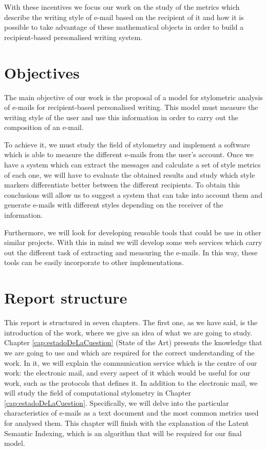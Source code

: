 With these incentives we focus our work on the study of the metrics which describe the writing style of e-mail based on the recipient of it and how it is possible to take advantage of these mathematical objects in order to build a recipient-based personalised writing system.

\section{Objectives}\label{sect:obj}
The main objective of our work is the proposal of a model for stylometric analysis of e-mails for recipient-based personalised writing. This model must measure the writing style of the user and use this information in order to carry out the composition of an e-mail.

To achieve it, we must study the field of stylometry and implement a software which is able to measure the different e-mails from the user's account. Once we have a system which can extract the messages and calculate a set of style metrics of each one, we will have to evaluate the obtained results and study which style markers differentiate better between the different recipients. To obtain this conclusions will allow us to suggest a system that can take into account them and generate e-mails with different styles depending on the receiver of the information.

Furthermore, we will look for developing reusable tools that could be use in other similar projects. With this in mind we will develop some web services which carry out the different task of extracting and measuring the e-mails. In this way, these tools can be easily incorporate to other implementations.

\section{Report structure}\label{sect:structure}
This report is structured in seven chapters. The first one, as we have said, is the introduction of the work, where we give an idea of what we are going to study. Chapter \ref{cap:estadoDeLaCuestion} (State of the Art) presents the knowledge that we are going to use and which are required for the correct understanding of the work. In it, we will explain the communication service which is the centre of our work: the electronic mail, and every aspect of it  which would be useful for our work, such as the protocols that defines it. In addition to the electronic mail, we will study the field of computational stylometry in Chapter \ref{cap:estadoDeLaCuestion}. Specifically, we will delve into the particular characteristics of e-mails as a text document and the most common metrics used for analysed them. This chapter will finish with the explanation of the Latent Semantic Indexing, which is an algorithm that will be required for our final model.

